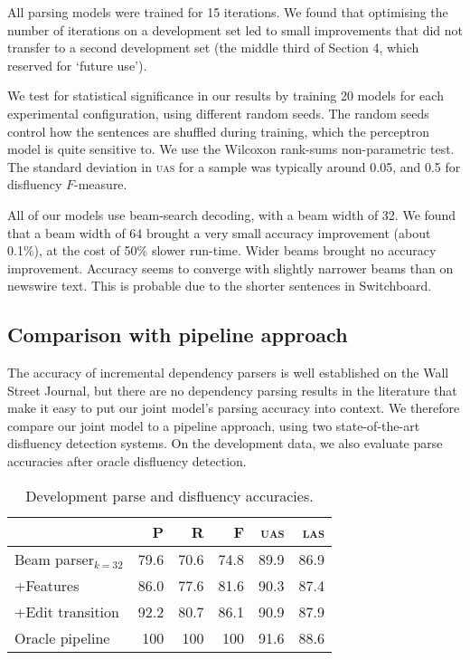 \documentclass[11pt,letterpaper]{article}
\begin{document}
All parsing models were trained for 15 iterations.
We found that optimising the number of iterations on a development set led to
small improvements that did not transfer to a second development set (the middle
third of Section 4, which \citet{Charniak01a} reserved for `future use').

We test for statistical significance in our results by training 20 models for
each experimental configuration, using different random seeds. The random seeds
control how the sentences are shuffled during training, which the perceptron
model is quite sensitive to.  We use the Wilcoxon rank-sums non-parametric test.
The standard deviation in \textsc{uas} for a sample was typically around 0.05,
and 0.5 for disfluency $F$-measure.

All of our models use beam-search decoding, with a beam width of 32. We found that
a beam width of 64 brought a very small accuracy improvement (about 0.1\%), at
the cost of 50\% slower run-time. Wider beams brought no accuracy improvement.
Accuracy seems to converge with slightly narrower beams than on newswire text.
This is probable due to the shorter sentences in Switchboard.


\subsection{Comparison with pipeline approach}
\label{sec:pipeline}
The accuracy of incremental dependency parsers is well established on the Wall
Street Journal, but there are no dependency parsing results in the literature
that make it easy to put our joint model's parsing accuracy into context.
We therefore compare our joint model to a pipeline approach, using two state-of-the-art
disfluency detection systems. On the development data, we also evaluate parse
accuracies after oracle disfluency detection.

\begin{table}
    \centering
    \small
    \begin{tabular}{l|rrr|rr}
        & P & R & F & \textsc{uas} & \textsc{las} \\
        \hline \hline
Beam parser$_{k=32}$  &	79.6	&	70.6	&	74.8	&	89.9	&	86.9 \\
+Features             &	86.0	&	77.6	&	81.6	&	90.3	&	87.4 \\
+Edit transition      &	92.2	&	80.7	&	86.1	&	90.9	&	87.9 \\
\hline       
Oracle pipeline  & 100 & 100 & 100 & 91.6    & 88.6 \\
\hline
    \end{tabular}
\caption{Development parse and disfluency accuracies.
\label{tab:dev}}
\end{table}
\end{document}
